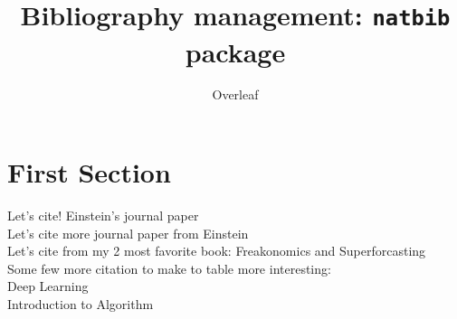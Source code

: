 \documentclass{article}
\title{Bibliography management: \texttt{natbib} package}
\author{Overleaf}
\date { }
\begin{document}
\maketitle

\tableofcontents

\section{First Section}

Let's cite! Einstein's journal paper \citet{PhysRev.47.777}\\
Let's cite more journal paper from Einstein \cite{einstein}\\
Let's cite from my 2 most favorite book: Freakonomics \cite{fine2009economics} and Superforcasting \cite{tetlock2016superforecasting}\\
Some few more citation to make to table more interesting:\\
Deep Learning \cite{lecun2015deep}\\
Introduction to Algorithm \cite{manber1989introduction}\\

\medskip


\end{document}
